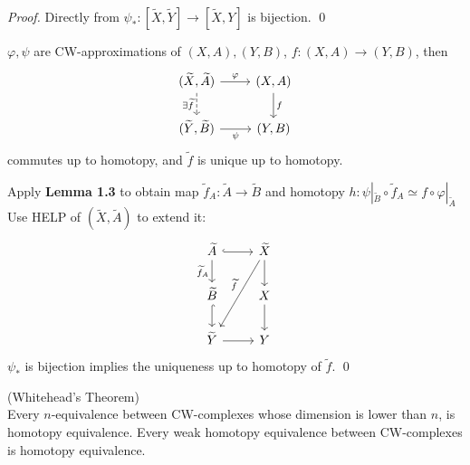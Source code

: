     \begin{proof}
        Directly from $\psi_{\ast} : [\widetilde{X},\widetilde{Y}] \to [\widetilde{X},Y]$ is bijection.
        \qed
    \end{proof}

    \begin{thm}
        $\varphi, \psi$ are CW-approximations of $(X,A), (Y,B)$,
        $f : (X,A) \to (Y,B)$, then 
        \[\begin{tikzcd}
            {(\widetilde{X},\widetilde{A})} & (X,A) \\
            {(\widetilde{Y},\widetilde{B})} & (Y,B)
            \arrow["{\exists \widetilde{f}}"', dashed, from=1-1, to=2-1]
            \arrow["\varphi", from=1-1, to=1-2]
            \arrow["f", from=1-2, to=2-2]
            \arrow["\psi"', from=2-1, to=2-2]
        \end{tikzcd}\] commutes up to homotopy,
        and $\widetilde{f}$ is unique up to homotopy.
    \end{thm}

    \begin{prf}
        Apply \textbf{Lemma 1.3} to obtain map $\widetilde{f}_A : \widetilde{A} \to \widetilde{B}$
        and homotopy $h : \psi |_{\widetilde{B}} \circ \widetilde{f}_A \simeq f \circ \varphi|_{\widetilde{A}}$
        Use HELP of $(\widetilde{X}, \widetilde{A})$ to extend it:
        \[\begin{tikzcd}
            {\widetilde{A}} & {\widetilde{X}} \\
            {\widetilde{B}} & X \\
            {\widetilde{Y}} & Y
            \arrow[hook, from=1-1, to=1-2]
            \arrow["{\widetilde{f}_A}"', from=1-1, to=2-1]
            \arrow[hook, from=2-1, to=3-1]
            \arrow[from=3-1, to=3-2]
            \arrow[from=1-2, to=2-2]
            \arrow[from=2-2, to=3-2]
            \arrow["{\widetilde{f}}"', from=1-2, to=3-1]
        \end{tikzcd}\]
        $\psi_{\ast}$ is bijection implies the uniqueness up to homotopy of $\widetilde{f}$.
        \qed
    \end{prf}

    \begin{thm}
        (Whitehead's Theorem)\\
        Every $n$-equivalence between CW-complexes whose dimension is lower than $n$, is homotopy equivalence.
        Every weak homotopy equivalence between CW-complexes is homotopy equivalence.
    \end{thm}

